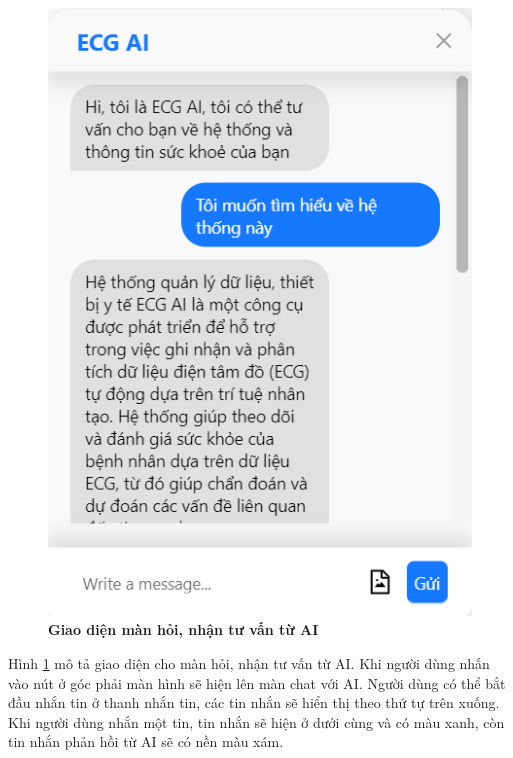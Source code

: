 \begin{figure}[H]
  \centering
  \includegraphics[scale=0.5]{Images/server/webUI/chat_ai.png}
  \caption[Giao diện màn hỏi, nhận tư vấn từ AI]{\bfseries \fontsize{12pt}{0pt}\selectfont Giao diện màn hỏi, nhận tư vấn từ AI}
  \label{chatAI} %
\end{figure}

Hình \ref{chatAI} mô tả giao diện cho màn hỏi, nhận tư vấn từ AI. Khi người dùng nhấn vào nút ở góc phải màn hình sẽ hiện lên màn chat với AI. 
Người dùng có thể bắt đầu nhắn tin ở thanh nhắn tin, các tin nhắn sẽ hiển thị theo thứ tự trên xuống. Khi người dùng nhắn một tin, tin nhắn sẽ hiện ở dưới cùng và 
có màu xanh, còn tin nhắn phản hồi từ AI sẽ có nền màu xám. 


